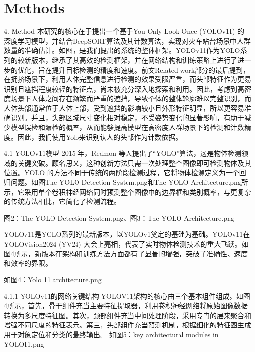\section{Methods}\label{section::Methods}
4. Method 
本研究的核心在于提出一个基于You Only Look Once (YOLOv11) 的深度学习模型，并结合DeepSORT算法及其计数算法，实现对火车站台场景中人群数量的准确估计。如图，是我们提出的系统的整体框架。YOLOv11作为YOLO系列的较新版本，继承了其高效的检测框架，并在网络结构和训练策略上进行了进一步的优化，旨在提升目标检测的精度和速度\cite{74_yolo11_Jocher_Ultralytics_YOLO_2023}。前文Related work部分的最后提到，在拥挤场景下，利用人体完整信息进行检测的效果受限严重，而头部特征作为更易识别且遮挡程度较轻的特征点，尚未被充分深入地探索和利用。因此，考虑到高密度场景下人体之间存在频繁而严重的遮挡，导致个体的整体轮廓难以完整识别，而人体头部通常位于人体上部，受到遮挡的影响较小且外形特征明显，所以更容易准确识别。并且，头部区域尺寸变化相对稳定，不受姿势变化的显著影响，有助于减少模型误检和漏检的概率，从而能够提高模型在高密度人群场景下的检测和计数精度。因此，我们使用Yolo来识别认人的头部作为计数依据。


4.1 YOLOv11模型
2015 年，Redmon 等人提出了“YOLO”算法，这是物体检测领域的关键突破\cite{76_redmon2016lookonceunifiedrealtime}。顾名思义，这种创新方法只需一次处理整个图像即可检测物体及其位置。YOLO 的方法不同于传统的两阶段检测过程，它将物体检测定义为一个回归问题\cite{76_redmon2016lookonceunifiedrealtime}。如图The YOLO Detection System.png和The YOLO Architecture.png所示，它采用单个卷积神经网络同时预测整个图像中的边界框和类别概率\cite{77_Du_article}，与更复杂的传统方法相比，它简化了检测流程。

图2：The YOLO Detection System.png、图3：The YOLO Architecture.png

YOLOv11是YOLO系列的最新版本，以YOLOv1奠定的基础为基础。YOLOv11在YOLOVision2024 (YV24) 大会上亮相，代表了实时物体检测技术的重大飞跃。如图4所示，新版本在架构和训练方法方面都有了显著的增强，突破了准确性、速度和效率的界限\cite{75_khanam2024yolov11overviewkeyarchitectural}。

如图4：Yolo 11 architecture.png \cite{80_ghosh_yolo11_2024}

4.1.1 YOLOv11的网络关键结构
YOLOV11架构的核心由三个基本组件组成。如图4所示，首先，骨干组件充当主要特征提取器，利用卷积神经网络将原始图像数据转换为多尺度特征图。其次，颈部组件充当中间处理阶段，采用专门的层来聚合和增强不同尺度的特征表示。第三，头部组件充当预测机制，根据细化的特征图生成用于对象定位和分类的最终输出\cite{75_khanam2024yolov11overviewkeyarchitectural}。
如图5：key architectural modules in YOLO11.png  

